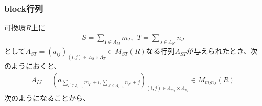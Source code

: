 \documentclass[dvipdfmx]{jsarticle}
\begin{document}
\subsubsection{block行列}%
可換環$R$上に
\begin{align*}
S=\sum_{I \in \varLambda_{M}} m_{I} ,\ \ T=\sum_{J \in \varLambda_{N}} n_{J}
\end{align*}
として$A_{ST} =\left( a_{ij} \right)_{(i,j) \in \varLambda_{S} \times \varLambda_{T}} \in M_{ST}(R)$なる行列$A_{ST} $が与えられたとき、次のようにおくと、
\begin{align*}
A_{IJ} =\left( a_{\sum_{I' \in \varLambda_{I - 1}} m_{I'} + i,\sum_{J' \in \varLambda_{J - 1}} n_{J'} + j} \right)_{(i,j) \in \varLambda_{m_{I}} \times \varLambda_{n_{J}}} \in M_{m_{I}n_{J}}(R)
\end{align*}
次のようになることから、
\end{document}
